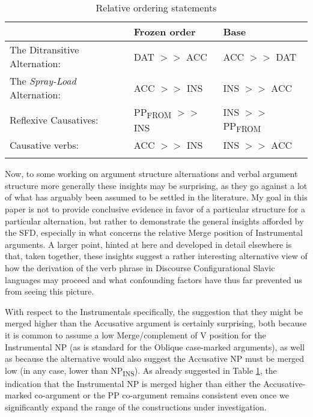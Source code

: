 \documentclass[output=paper,colorlinks,citecolor=brown]{langscibook}
\begin{document}
\begin{table}
\caption{Relative ordering statements}
\label{tab:relative ordering}

\begin{tabularx}{.9\textwidth}{lll}
 \lsptoprule
& Frozen order &   Base\\
 \midrule
 The Ditransitive Alternation: &   DAT $>>$ ACC  &    ACC $>>$ DAT\\
The \textit{Spray-Load} Alternation: &    ACC $>>$ INS &   INS $>>$ ACC \\

Reflexive Causatives:  &   PP\textsubscript{FROM} $>>$ INS  &  INS $>>$ PP\textsubscript{FROM}\\

Causative verbs:   &   ACC $>>$ INS &   INS $>>$ ACC\\
\lspbottomrule
        
\end{tabularx}
\end{table}


Now, to some working on argument structure alternations and verbal argument structure more generally these insights may be surprising, as they go against a lot of what has arguably been assumed to be settled in the literature. My goal in this paper is not to provide conclusive evidence in favor of a particular structure for a particular alternation, but rather to demonstrate the general insights afforded by the SFD, especially in what concerns the relative Merge position of Instrumental arguments. A larger point, hinted at here and developed in detail elsewhere \citep{Antonyukinpreparation} is that, taken together, these insights suggest a rather interesting alternative view of how the derivation of the verb phrase in Discourse Configurational Slavic languages may proceed and what confounding factors have thus far prevented us from seeing this picture. 

  With respect to the Instrumentals specifically, the suggestion that they might be merged higher than the Accusative argument is certainly surprising, both because it is common to assume a low Merge/complement of V position for the Instrumental NP (as is standard for the Oblique case-marked arguments), as well as because the alternative would also suggest the Accusative NP must be merged low (in any case, lower than NP\textsubscript{INS}). As already suggested in Table \ref{tab:relative ordering}, the indication that the Instrumental NP is merged higher than either the Accusative-marked co-argument or the PP co-argument remains consistent even once we significantly expand the range of the constructions under investigation. 
\end{document}
